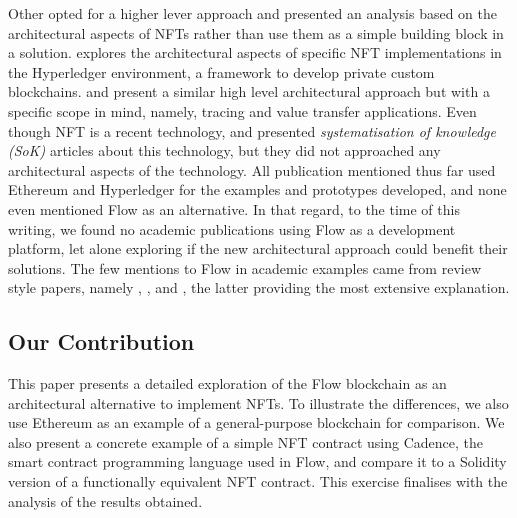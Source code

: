 \documentclass[../NFTComp_IEEE.tex]{subfiles}
\begin{document}
Other opted for a higher lever approach and presented an analysis based on the architectural aspects of NFTs rather than use them as a simple building block in a solution. \cite{Hong2019} explores the architectural aspects of specific NFT implementations in the Hyperledger environment, a framework to develop private custom blockchains. \cite{Yang2022} and \cite{Bal2019} present a similar high level architectural approach but with a specific scope in mind, namely, tracing and value transfer applications. Even though NFT is a recent technology, \cite{Wang2021b} and \cite{Ma2023} presented \textit{systematisation of knowledge (SoK)} articles about this technology, but they did not approached any architectural aspects of the technology. All publication mentioned thus far used Ethereum and Hyperledger for the examples and prototypes developed, and none even mentioned Flow as an alternative. In that regard, to the time of this writing, we found no academic publications using Flow as a development platform, let alone exploring if the new architectural approach could benefit their solutions. The few mentions to Flow in academic examples came from review style papers, namely \cite{Wang2021}, \cite{Razi2024}, and \cite{Guidi2023}, the latter providing the most extensive explanation.

\subsection{Our Contribution}
This paper presents a detailed exploration of the Flow blockchain as an architectural alternative to implement NFTs. To illustrate the differences, we also use Ethereum as an example of a general-purpose blockchain for comparison. We also present a concrete example of a simple NFT contract using Cadence, the smart contract programming language used in Flow, and compare it to a Solidity version of a functionally equivalent NFT contract. This exercise finalises with the analysis of the results obtained.
\end{document}
